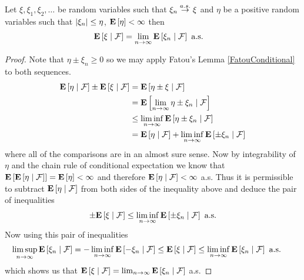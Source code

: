 \begin{lem}\label{DCTConditional}Let $\xi, \xi_1, \xi_2, \dotsc$ be
  random variables such that $\xi_n \toas \xi$ and $\eta$ be a
  positive random variables such that $\abs{\xi_n} \leq \eta$,
$\expectation{\eta} <  \infty$ then 
\begin{align*}
\cexpectationlong{\mathcal{F}}{\xi} &= \lim_{n \to \infty}
\cexpectationlong{\mathcal{F}}{\xi_n} \text{ a.s.}
\end{align*}
\end{lem}
\begin{proof}
Note that $\eta \pm \xi_n \geq 0$ so we may apply Fatou's Lemma
\ref{FatouConditional} to both sequences.
\begin{align*}
\cexpectationlong{\mathcal{F}}{\eta} \pm
\cexpectationlong{\mathcal{F}}{\xi}  &=\cexpectationlong{\mathcal{F}}{\eta \pm \xi} \\
&=\cexpectationlong{\mathcal{F}}{\lim_{n \to \infty} \eta \pm \xi_n}
\\
&\leq \liminf_{n \to \infty} \cexpectationlong{\mathcal{F}}{ \eta \pm \xi_n} \\
&= \cexpectationlong{\mathcal{F}}{ \eta} + \liminf_{n \to \infty} \cexpectationlong{\mathcal{F}}{ \pm \xi_n} \\
\end{align*}
where all of the comparisons are in an almost sure sense.  Now by
integrability of $\eta$ and the chain rule of conditional expectation 
we know that $\expectation
{\cexpectationlong{\mathcal{F}}{ \eta}}=
\expectation{\eta} < \infty$ and therefore
$\cexpectationlong{\mathcal{F}}{ \eta} < \infty$ a.s.  Thus it is
permissible to subtract $\cexpectationlong{\mathcal{F}}{ \eta}$ from
both sides of the inequality above and deduce the pair of inequalities
\begin{align*}
\pm\cexpectationlong{\mathcal{F}}{\xi}  &\leq \liminf_{n \to \infty}
\cexpectationlong{\mathcal{F}}{ \pm \xi_n} \text{ a.s.}\\
\end{align*}
Now using this pair of inequalities
\begin{align*}
\limsup_{n \to \infty} \cexpectationlong{\mathcal{F}}{ \xi_n} &=
-\liminf_{n \to \infty} \cexpectationlong{\mathcal{F}}{ -\xi_n} \leq \cexpectationlong{\mathcal{F}}{\xi} \leq \liminf_{n \to \infty}
\cexpectationlong{\mathcal{F}}{\xi_n} \text{ a.s. }
\end{align*}
which shows us that $\cexpectationlong{\mathcal{F}}{\xi} = \lim_{n \to \infty}
\cexpectationlong{\mathcal{F}}{\xi_n}$ a.s.
\end{proof}

